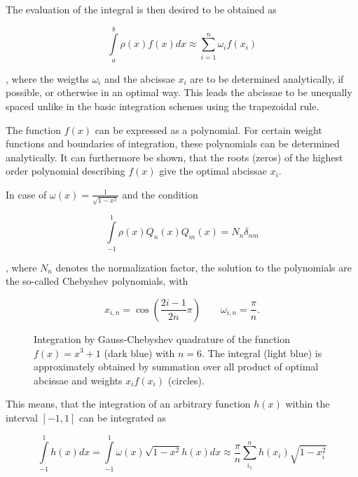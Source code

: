 The evaluation of the integral is then desired to be obtained as

\begin{equation}
  \int\limits_a^b \rho(x) f(x) dx \approx \sum\limits_{i=1}^n \omega_i f(x_i)
\end{equation}

, where the weigths $\omega_i$ and the abcissae $x_i$ are to be determined
analytically, if possible, or otherwise in an optimal way. This leads the abcissae
to be unequally spaced unlike in the basic
integration schemes using the trapezoidal rule.

The function $f(x)$ can be expressed as a polynomial.
For certain weight functions and boundaries
of integration, these
polynomials can be determined analytically.
It can furthermore be shown, that the roots (zeros) of the highest order polynomial
describing $f(x)$ give the optimal abcissae $x_i$.

In case of
$\omega(x)= \frac{1}{\sqrt{1-x^2}}$ and the condition

\begin{equation}
  \int\limits_{-1}^{1} \rho(x) Q_n(x) Q_m(x) = N_n \delta_{nm}
\end{equation}

, where $N_n$ denotes the normalization factor,
the solution to the polynomials are the so-called Chebyshev polynomials, with

\begin{equation}
  x_{i,n} = \cos \left( \frac{2i-1}{2n} \pi \right)
  \quad\quad \omega_{i,n} = \frac \pi n .
\end{equation}

\begin{figure}[ht]
  \centering
  
  \caption{Integration by Gauss-Chebyshev quadrature of the function
           $f(x)=x^3 + 1$ (dark blue) with $n=6$. The integral (light blue)
           is approximately obtained by summation
           over all product of optimal abcissae and weights $x_if(x_i)$ (circles).}
  \label{figure:gaussian_quadrature}
\end{figure}

This means, that the integration of an arbitrary function $h(x)$ within
the interval $[-1,1]$ can be integrated as

\begin{equation}
  \int\limits_{-1}^1 h(x) dx = \int\limits_{-1}^1 \omega(x) \sqrt{1-x^2} h(x) dx
  \approx \frac \pi n \sum\limits_{i_1}^n h(x_i) \sqrt{1-x_i^2}
\end{equation}

